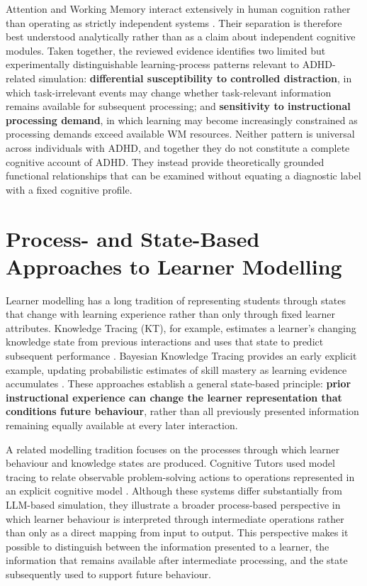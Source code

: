 Attention and Working Memory interact extensively in human cognition rather than operating as strictly independent systems \cite{awh2006interactions}. Their separation is therefore best understood analytically rather than as a claim about independent cognitive modules. Taken together, the reviewed evidence identifies two limited but experimentally distinguishable learning-process patterns relevant to ADHD-related simulation: \textbf{differential susceptibility to controlled distraction}, in which task-irrelevant events may change whether task-relevant information remains available for subsequent processing; and \textbf{sensitivity to instructional processing demand}, in which learning may become increasingly constrained as processing demands exceed available WM resources. Neither pattern is universal across individuals with ADHD, and together they do not constitute a complete cognitive account of ADHD. They instead provide theoretically grounded functional relationships that can be examined without equating a diagnostic label with a fixed cognitive profile.

\section{Process- and State-Based Approaches to Learner Modelling}
\label{sec:process-state-learner-modelling}

Learner modelling has a long tradition of representing students through states that change with learning experience rather than only through fixed learner attributes. Knowledge Tracing (KT), for example, estimates a learner's changing knowledge state from previous interactions and uses that state to predict subsequent performance \cite{abdelrahman-etal-2023-knowledge}. Bayesian Knowledge Tracing provides an early explicit example, updating probabilistic estimates of skill mastery as learning evidence accumulates \cite{corbett-anderson-1995-knowledge}. These approaches establish a general state-based principle: \textbf{prior instructional experience can change the learner representation that conditions future behaviour}, rather than all previously presented information remaining equally available at every later interaction.

A related modelling tradition focuses on the processes through which learner behaviour and knowledge states are produced. Cognitive Tutors used model tracing to relate observable problem-solving actions to operations represented in an explicit cognitive model \cite{anderson-etal-1995-cognitive}. Although these systems differ substantially from LLM-based simulation, they illustrate a broader process-based perspective in which learner behaviour is interpreted through intermediate operations rather than only as a direct mapping from input to output. This perspective makes it possible to distinguish between the information presented to a learner, the information that remains available after intermediate processing, and the state subsequently used to support future behaviour.


